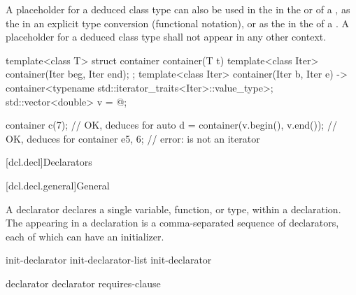 \pnum
A placeholder for a deduced class type
can also be used
in the 
in the  or 
of a ,
as the 
in an explicit type conversion (functional notation),
or
as the  in the 
of a .
A placeholder for a deduced class type
shall not appear in any other context.

\pnum
\begin{example}
\begin{codeblock}
template<class T> struct container {
    container(T t) {}
    template<class Iter> container(Iter beg, Iter end);
};
template<class Iter>
container(Iter b, Iter e) -> container<typename std::iterator_traits<Iter>::value_type>;
std::vector<double> v = { @\commentellip@ };

container c(7);                         // OK, deduces  for 
auto d = container(v.begin(), v.end()); // OK, deduces  for 
container e{5, 6};                      // error:  is not an iterator
\end{codeblock}
\end{example}
%

[dcl.decl]{Declarators}%

[dcl.decl.general]{General}%

%
%
%
%
%

\pnum
A declarator declares a single variable, function, or type, within a declaration.
The
appearing in a declaration
is a comma-separated sequence of declarators,
each of which can have an initializer.

\begin{bnf}
\br
    init-declarator\br
    init-declarator-list \terminal{,} init-declarator
\end{bnf}

\begin{bnf}
\br
    declarator \br
    declarator requires-clause
\end{bnf}

